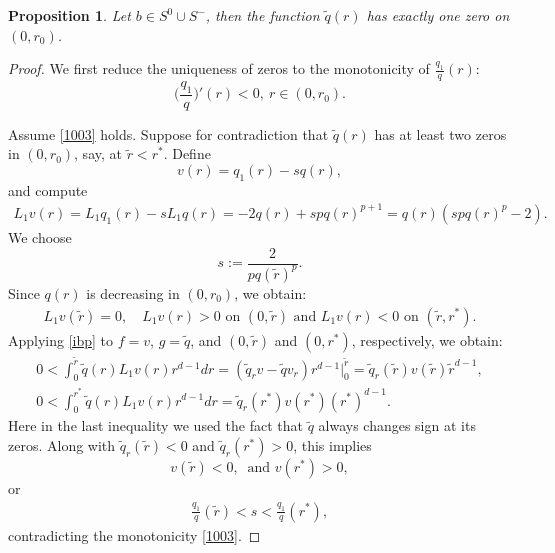 \documentclass[12pt]{amsart}
\newtheorem{proposition}[theorem]{Proposition}
\begin{document}
          
     \begin{proposition}\label{prop: uniq}   Let $b \in S^0\cup S^-$, then the function $\tilde q(r)$ has exactly one zero on $(0,r_0)$. 
     \end{proposition}
     \begin{proof}
     We first reduce the uniqueness of zeros to the monotonicity of $\frac {q_1}{q}(r)$:   
     \begin{equation}\label{1003}
     \bigl(\frac{q_1}q\bigr)'(r)<0, \ r\in (0, r_0). 
     \end{equation}
   
  Assume \eqref{1003} holds. Suppose for contradiction that $\tilde q(r)$ has at least two zeros in $(0,r_0)$, say, at $\tilde r<r^*$. Define 
     \[
     v(r)=q_1(r)-sq(r),
     \]
     and compute 
     \begin{align*}
     L_1v(r)=L_1 q_1(r)-sL_1q(r)=-2q(r)+spq(r)^{p+1}=q(r)(sp q(r)^p-2). 
     \end{align*}
     We choose 
     \[
     s:=\frac 2{pq(\tilde r)^p}.
     \]
     Since $q(r)$ is decreasing in $(0,r_0)$, we obtain: 
     \begin{align*}
     L_1v(\tilde r)=0,\quad L_1v(r)>0 \mbox{ on } (0, \tilde r) \mbox{ and }L_1 v(r)<0 \mbox{ on } (\tilde r, r^*). 
     \end{align*}
 Applying \eqref{ibp} to $f=v$, $g=\tilde q$, and $(0, \tilde r)$ and $(0, r^*)$, respectively, we obtain: 
     \begin{align}
    0<\int_0^{\tilde r} \tilde q(r) L_1 v(r) r^{d-1} dr=(\tilde q_r v-\tilde q v_r)r^{d-1}|_0^{\tilde r}=\tilde q_r(\tilde r) v(\tilde r)\tilde r^{d-1},\label{1117}\\
    0<\int_0^{r^*} \tilde q(r)L_1 v(r) r^{d-1}dr=\tilde q_r(r^*)v(r^*) (r^*)^{d-1}. \label{1118}
     \end{align}
  Here in the last inequality we used the fact that $\tilde q$ always changes sign at its zeros.
   Along with $\tilde q_r(\tilde r)<0$ and $\tilde q_r(r^*)>0$, this implies
        \[
     v(\tilde r)<0, \ \mbox{ and } v(r^*)>0, 
     \]
or
     \begin{align}\label{1227}
     \frac{q_1}q(\tilde r)<s<\frac{q_1}q(r^*),
     \end{align}
  contradicting the monotonicity \eqref{1003}. 
  

\end{proof}
\end{document}
